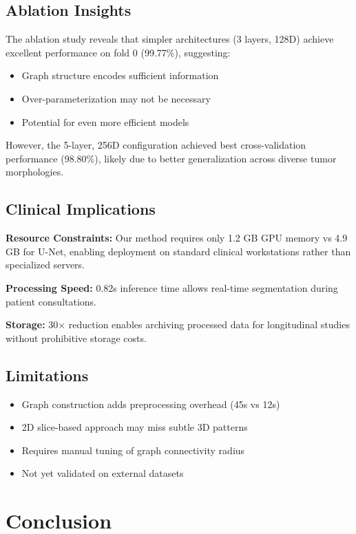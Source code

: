 \documentclass[conference]{IEEEtran}
\begin{document}
\subsection{Ablation Insights}

The ablation study reveals that simpler architectures (3 layers, 128D) achieve excellent performance on fold 0 (99.77\%), suggesting:
\begin{itemize}
\item Graph structure encodes sufficient information
\item Over-parameterization may not be necessary
\item Potential for even more efficient models
\end{itemize}

However, the 5-layer, 256D configuration achieved best cross-validation performance (98.80\%), likely due to better generalization across diverse tumor morphologies.

\subsection{Clinical Implications}

\textbf{Resource Constraints:} Our method requires only 1.2 GB GPU memory vs 4.9 GB for U-Net, enabling deployment on standard clinical workstations rather than specialized servers.

\textbf{Processing Speed:} 0.82s inference time allows real-time segmentation during patient consultations.

\textbf{Storage:} 30× reduction enables archiving processed data for longitudinal studies without prohibitive storage costs.

\subsection{Limitations}

\begin{itemize}
\item Graph construction adds preprocessing overhead (45s vs 12s)
\item 2D slice-based approach may miss subtle 3D patterns
\item Requires manual tuning of graph connectivity radius
\item Not yet validated on external datasets
\end{itemize}

\section{Conclusion}
\end{document}
